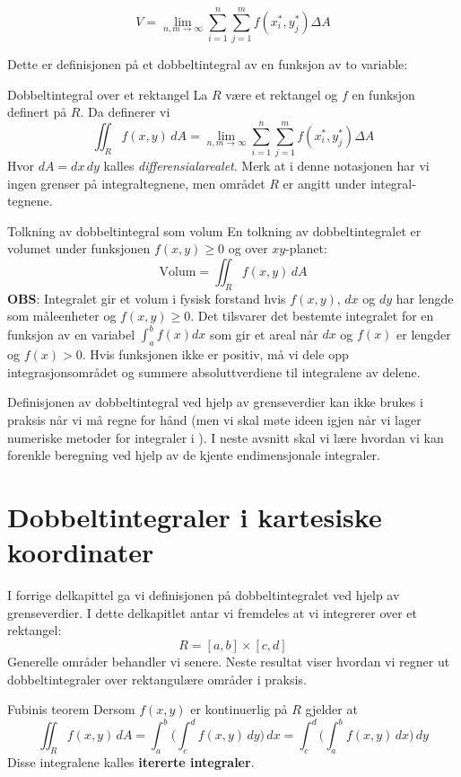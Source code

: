 \[
V = \lim_{n, m \to \infty} \sum_{i=1}^n \sum_{j=1}^m f(x_i^*, y_j^*) \Delta A
\]

Dette er definisjonen på et dobbeltintegral av en funksjon av to variable:

\begin{defn}{Dobbeltintegral over et rektangel}
La \( R \) være et rektangel og $f$ en funksjon definert på \(R\). Da definerer vi
\[
\iint_R f(x, y) \, dA = \lim_{n, m \to \infty} \sum_{i=1}^n \sum_{j=1}^m f(x_i^*, y_j^*) \Delta A
\]
Hvor \( dA = dx\, dy \) kalles \emph{differensialarealet}. Merk at i denne notasjonen har vi ingen grenser på integraltegnene, men området \( R \) er angitt under integral-tegnene.
\end{defn}

\begin{rem}{Tolkning av dobbeltintegral som volum}
En tolkning av dobbeltintegralet er volumet under funksjonen \( f(x, y) \geq 0\) og over \( xy \)-planet:
\[
\text{Volum} = \iint_R f(x, y) \, dA
\]
\textbf{OBS}:
Integralet gir et volum i fysisk forstand hvis $f(x,y)$, $dx$ og $dy$ har lengde som måleenheter og
$f(x,y)\geq 0$.  Det tilsvarer det bestemte integralet for en funksjon av en variabel $\int_a^b f(x)d x$ som gir et areal når $dx$ og $f(x)$ er lengder og $f(x)>0$. Hvis funksjonen ikke er positiv, må vi dele opp integrasjonsområdet og summere absoluttverdiene til integralene av delene.
\end{rem}
Definisjonen av dobbeltintegral ved hjelp av grenseverdier kan ikke brukes i praksis når vi må regne for hånd (men vi skal møte ideen igjen når vi lager numeriske metoder for integraler i ). I neste avsnitt skal vi lære hvordan vi kan forenkle beregning ved hjelp av de kjente endimensjonale integraler.

\section{Dobbeltintegraler i kartesiske koordinater}\label{sect:dobbelint}

I forrige delkapittel ga vi definisjonen på dobbeltintegralet ved hjelp av grenseverdier. I dette delkapitlet antar vi fremdeles at vi integrerer over et rektangel:
\[
R = [a, b] \times [c, d]
\]
Generelle områder behandler vi senere.
Neste resultat viser hvordan vi regner ut dobbeltintegraler over rektangulære områder i praksis.

\begin{thrm}{Fubinis teorem}
Dersom \( f(x, y) \) er kontinuerlig på \( R \) gjelder at
\[
\iint_R f(x, y) \, dA = \int_a^b \bigl(\int_c^d f(x, y) \, dy \bigr) \, dx = \int_c^d \bigl(\int_a^b f(x, y) \, dx \bigr) \, dy
\]
Disse integralene kalles \textbf{itererte integraler}. \label{thm:fubini}
\end{thrm}

